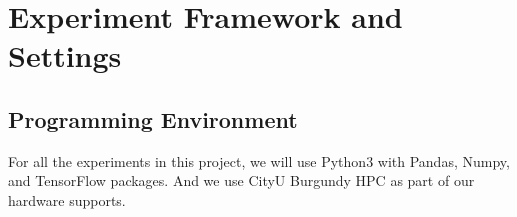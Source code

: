 
\chapter{Experiment Framework and Settings} %

\label{Chapter3}



\section{Programming Environment}
For all the experiments in this project, we will use Python3 with Pandas, Numpy, and TensorFlow packages. And we use CityU Burgundy HPC as part of our hardware supports.

